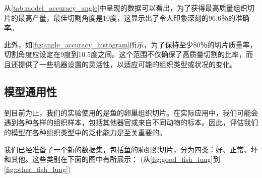 从\autoref{tab:model_accuracy_angle}中呈现的数据可以看出，为了获得最高质量组织切片的最高产量，最佳切割角度是10度，这显示出了令人印象深刻的96.6％的准确率。

此外，如\autoref{fig:angle_accuracy_histogram}所示，为了保持至少80％的切片质量率，切割角度应设定在9度到10.5度之间。这个范围不仅确保了高质量切割的比率，而且还提供了一些机器设置的灵活性，以适应可能的组织类型或状况的变化。

\subsection{模型通用性}

到目前为止，我们的实验使用的是鱼的卵巢组织切片。在实际应用中，我们可能会遇到各种各样的组织样本，包括其他器官或来自不同动物的标本。因此，评估我们的模型在各种组织类型中的泛化能力是至关重要的。

我们已经准备了一个新的数据集，包括鱼的肺组织切片，分为四类：好、正常、坏和其他。这些类别在下面的图中有所展示： (从\autoref{fig:good_fish_lung}到\autoref{fig:other_fish_lung})

